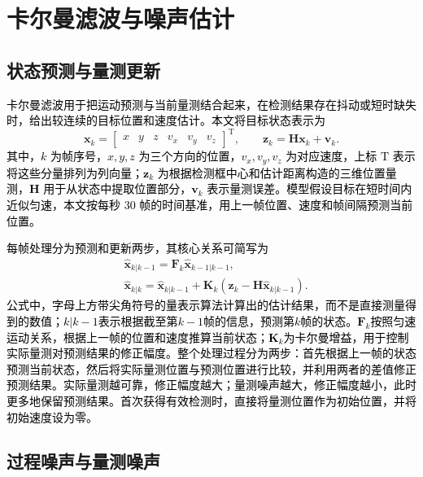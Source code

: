 \section{卡尔曼滤波与噪声估计}

\subsection{状态预测与量测更新}

\textcolor{black}{卡尔曼滤波用于把运动预测与当前量测结合起来，在检测结果存在抖动或短时缺失时，给出较连续的目标位置和速度估计\cite{kalman}。本文将目标状态表示为}
\begin{equation}
\mathbf x_k=\begin{bmatrix}x&y&z&v_x&v_y&v_z\end{bmatrix}^{\mathrm{T}},
\qquad
\mathbf z_k=\mathbf H\mathbf x_k+\mathbf v_k.
\label{eq:ch2_state}
\end{equation}
\textcolor{black}{其中，$k$ 为帧序号，$x,y,z$ 为三个方向的位置，$v_x,v_y,v_z$ 为对应速度，上标 $\mathrm{T}$ 表示将这些分量排列为列向量；$\mathbf z_k$ 为根据检测框中心和估计距离构造的三维位置量测，$\mathbf H$ 用于从状态中提取位置部分，$\mathbf v_k$ 表示量测误差。模型假设目标在短时间内近似匀速，本文按每秒 $30$ 帧的时间基准，用上一帧位置、速度和帧间隔预测当前位置。}

\textcolor{black}{每帧处理分为预测和更新两步，其核心关系可简写为}
\begin{equation}
\begin{aligned}
&\hat{\mathbf x}_{k|k-1}=\mathbf F_k\hat{\mathbf x}_{k-1|k-1},\\
&\hat{\mathbf x}_{k|k}=\hat{\mathbf x}_{k|k-1}
+\mathbf K_k(\mathbf z_k-\mathbf H\hat{\mathbf x}_{k|k-1}).
\end{aligned}
\label{eq:ch2_predict}
\end{equation}
\textcolor{black}{公式中，字母上方带尖角符号的量表示算法计算出的估计结果，而不是直接测量得到的数值；$k|k-1$表示根据截至第$k-1$帧的信息，预测第$k$帧的状态。$\mathbf F_k$按照匀速运动关系，根据上一帧的位置和速度推算当前状态；$\mathbf K_k$为卡尔曼增益，用于控制实际量测对预测结果的修正幅度。整个处理过程分为两步：首先根据上一帧的状态预测当前状态，然后将实际量测位置与预测位置进行比较，并利用两者的差值修正预测结果。实际量测越可靠，修正幅度越大；量测噪声越大，修正幅度越小，此时更多地保留预测结果。首次获得有效检测时，直接将量测位置作为初始位置，并将初始速度设为零。}

\subsection{过程噪声与量测噪声}

